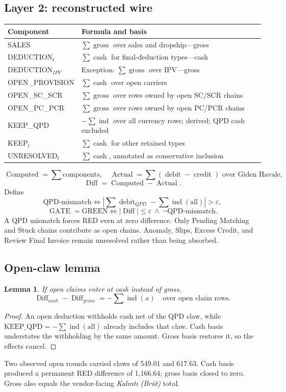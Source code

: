 \documentclass[11pt,a4paper]{article}
\newcommand{\eps}{\varepsilon}
\newcommand{\cash}{\operatorname{cash}}
\newcommand{\gross}{\operatorname{gross}}
\newcommand{\ind}{\operatorname{ind}}
\newtheorem{lemma}{Lemma}
\theoremstyle{definition}
\begin{document}
\subsection{Layer 2: reconstructed wire}
\begin{longtable}{@{}p{}p{}@{}}
\toprule
\textbf{Component} & \textbf{Formula and basis}\\
\midrule
\endhead
SALES & $\sum\gross$ over sales and dropship---gross\\
DEDUCTION$_t$ & $\sum\cash$ for final-deduction types---cash\\
DEDUCTION$_{IPV}$ & Exception: $\sum\gross$ over IPV---gross\\
OPEN\_PROVISION & $\sum\cash$ over open carriers\\
OPEN\_SC\_SCR & $\sum\gross$ over rows owned by open SC/SCR chains\\
OPEN\_PC\_PCR & $\sum\gross$ over rows owned by open PC/PCR chains\\
KEEP\_QPD & $-\sum\ind$ over all currency rows; derived; QPD cash excluded\\
KEEP$_t$ & $\sum\cash$ for other retained types\\
UNRESOLVED$_t$ & $\sum\cash$, annotated as conservative inclusion\\
\bottomrule
\end{longtable}
\[
\operatorname{Computed}=\sum\text{components},\quad
\operatorname{Actual}=\sum(\operatorname{debit}-\operatorname{credit})
\text{ over Giden Havale},
\]
\[
\operatorname{Diff}=\operatorname{Computed}-\operatorname{Actual}.
\]
Define
\[
\text{QPD-mismatch}\iff
\left|\sum\operatorname{debit}_{QPD}-\sum\ind(\text{all})\right|>\eps,
\]
\[
\operatorname{GATE}=\mathrm{GREEN}\iff
|\operatorname{Diff}|\le\eps\ \wedge\ \neg\text{QPD-mismatch}.
\]
A QPD mismatch forces RED even at zero difference. Only Pending Matching
and Stuck chains contribute as open chains. Anomaly, Slips, Excess
Credit, and Review Final Invoice remain unresolved rather than being
absorbed.
\subsection{Open-claw lemma}
\begin{lemma}
If open claims enter at cash instead of gross,
\[
\operatorname{Diff}_{cash}-\operatorname{Diff}_{gross}
=-\sum\ind(x)\quad\text{over open claim rows}.
\]
\end{lemma}
\begin{proof}
An open deduction withholds cash net of the QPD claw, while
$\mathrm{KEEP\_QPD}=-\sum\ind(\text{all})$ already includes that claw.
Cash basis understates the withholding by the same amount. Gross basis
restores it, so the effects cancel.
\end{proof}
Two observed open rounds carried claws of 549.01 and 617.63. Cash basis
produced a permanent RED difference of 1,166.64; gross basis closed to
zero. Gross also equals the vendor-facing \emph{Kalıntı (Brüt)} total.
\end{document}
